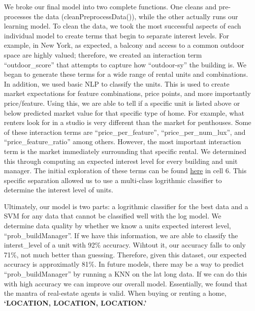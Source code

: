 \documentclass[11pt]{article}
\begin{document}
We broke our final model into two complete functions. One cleans and
pre-processes the data (cleanPreprocessData()), while the other actually
runs our learning model. To clean the data, we took the most successful
aspects of each individual model to create terms that begin to separate
interest levels. For example, in New York, as expected, a balcony and
access to a common outdoor space are highly valued; therefore, we
created an interaction term ``outdoor\_score'' that attempts to capture
how ``outdoor-sy'' the building is. We began to generate these terms for
a wide range of rental units and combinations. In addition, we used
basic NLP to classify the units. This is used to create market
expectations for feature combinations, price points, and more
importantly price/feature. Using this, we are able to tell if a specific
unit is listed above or below predicted market value for that specific
type of home. For example, what renters look for in a studio is very
different than the market for penthouses. Some of these interaction
terms are ``price\_per\_feature'', ``price\_per\_num\_lux'', and
``price\_feature\_ratio'' among others. However, the most important
interaction term is the market immediately surrounding that specific
rental. We determined this through computing an expected interest level
for every building and unit manager. The initial exploration of these
terms can be found
\href{https://github.com/bfine9618/ese305FinalProject/blob/master/Initial\%20models/KNN\%20\%26\%20CV\%20Logistic\%20Reg.ipynb}{here}
in cell 6. This specific separation allowed us to use a multi-class
logrithmic classifier to determine the interest level of units.

Ultimately, our model is two parts: a logrithmic classifier for the best
data and a SVM for any data that cannot be classified well with the log
model. We determine data quality by whether we know a units expected
interest level, ``prob\_buildManager''. If we have this information, we
are able to classify the interst\_level of a unit with 92\% accuracy.
Wihtout it, our accuracy falls to only 71\%, not much better than
guessing. Therefore, given this dataset, our expected accuracy is
approximatly 81\%. In future models, there may be a way to predict
``prob\_buildManager'' by running a KNN on the lat long data. If we can
do this with high accuracy we can improve our overall model.
Essentially, we found that the mantra of real-estate agents is valid.
When buying or renting a home, \textbf{`LOCATION, LOCATION, LOCATION.'}
\end{document}
